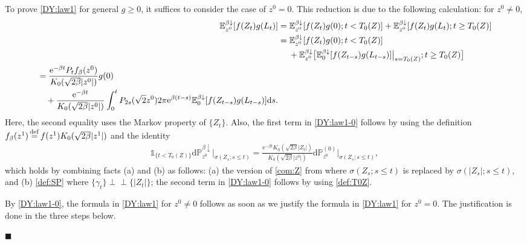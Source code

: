 \documentclass[12pt, twoside]{article}
\numberwithin{figure}{section}
\newcommand{\e}{{\mathrm e}}
\newcommand{\1}{\mathds 1}
\newcommand{\da}{{\downarrow}}
\newcommand{\ind}{{\perp\!\!\!\perp}}
\renewcommand{\P}{{\mathbb P}}
\newcommand{\E}{{\mathbb E}}
\renewcommand{\d}{{\mathrm d}}
\newcommand{\2}{{\mathbf 1}}
\newcommand{\defeq}{{\stackrel{\rm def}{=}}}
\renewenvironment{proof}[1][\proofname]{\noindent {\bfseries #1.}\;}{\hfill\ensuremath{\blacksquare}\\}
\newcommand{\cc}{{^\circ}}
\newcommand{\two}{{\sqrt{2}}}
\begin{document}
\begin{proof}[Proof of Theorem~\ref{thm:formulas}]
\noindent {\bf (2$\cc$)} To prove \eqref{DY:law1} for general $g\geq 0$, it suffices to consider the case of $z^0=0$. This reduction is due to the following calculation: for $z^0\neq 0$,
\begin{align}
\E_{z^0}^{\beta\da}[f(Z_t)g(L_t)]
&=\E^{\beta\da}_{z^0}[f(Z_t)g(0);t<T_0(Z)]+\E^{\beta\da}_{z^0}[f(Z_t)g(L_t);t\geq T_0(Z)]\notag\\
&=\E^{\beta\da}_{z^0}[f(Z_t)g(0);t<T_0(Z)]\notag\\
&\quad\;+\E^{\beta\da}_{z^0}\bigl[\E^{\beta\da}_0[f(Z_{t-s})g(L_{t-s})]\big|_{s=T_0(Z)};t\geq T_0(Z)\bigr]\notag\\
\begin{split}
&=\frac{\e^{-\beta t}P_{t}f_\beta(z^0)}{K_0(\sqrt{2\beta}|z^0|)}g(0)\\
&\quad +\frac{\e^{-\beta t}}{K_0(\sqrt{2\beta}|z^0|)}\int_0^t P_{2s}(\two z^0)2\pi \e^{\beta (t-s)}\E^{\beta\da}_0[f(Z_{t-s})g(L_{t-s})]\d s.\label{DY:law1-0}
\end{split}
\end{align}
Here, the second equality uses the Markov property of $\{Z_t\}$. Also, 
the first term in \eqref{DY:law1-0} follows by using the definition  $f_{\beta}(z^1)\,\defeq\, f(z^1)K_0(\sqrt{2\beta}|z^1|)$ and the identity
\begin{align}\label{com:Z}
\1_ {\{t<T_0(Z)\}}
\d \P^{\beta\da}_{z^0}\big|_{\sigma(Z_s;s\leq t)}=\frac{\e^{-\beta t}K_0(\sqrt{2\beta}|Z_t|)}{K_0(\sqrt{2\beta}|z^0|)}\d \P^{(0)}_{z^0}\big|_{\sigma(Z_s;s\leq t)},
\end{align}
which holds by combining facts (a) and (b) as follows: (a) the version of \eqref{com:Z} from \cite[(2.4) on p.883]{DY:Krein} where $\sigma(Z_s;s\leq t)$ is replaced by $\sigma(|Z_s|;s\leq t)$, and (b) \eqref{def:SP} where $\{\gamma_t\}\ind \{|Z_t|\}$; the second term in \eqref{DY:law1-0} follows by using \eqref{def:T0Z}.

By \eqref{DY:law1-0}, the formula in \eqref{DY:law1} for $z^0\neq 0$ follows as soon as we justify the formula in \eqref{DY:law1} for $z^0=0$. The justification is done in the three steps below. \smallskip 


\end{proof}
\end{document}
